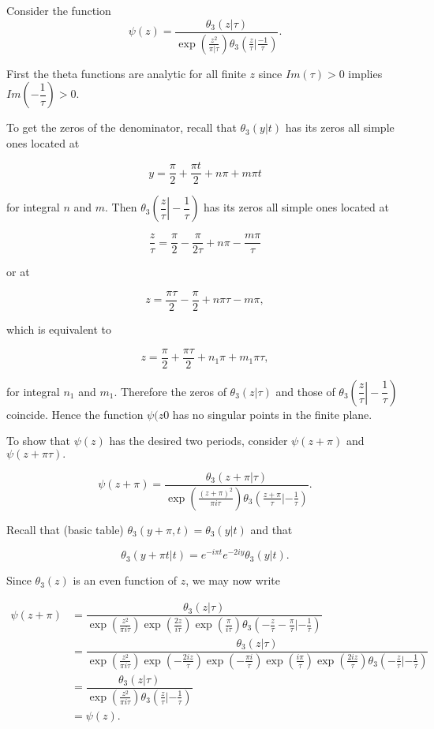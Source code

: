 \begin{solution}
Consider the function
$$\psi(z) = \dfrac{\theta_3(z | \tau)}{\exp \left( \frac{z^2}{\pi | \tau} \right) \theta_3(\frac{z}{\tau} | \frac{-1}{\tau})}.$$

First the theta functions are analytic for all finite $z$ since $Im(\tau) > 0$ implies $Im\left( -\dfrac{1}{\tau} \right) > 0.$ 

To get the zeros of the denominator, recall that $\theta_3(y|t)$ has its zeros all simple ones located at

$$y = \dfrac{\pi}{2} + \dfrac{\pi t}{2} + n \pi + m \pi t$$

for integral $n$ and $m$. Then $\theta_3 \left( \left. \dfrac{z}{\tau} \right| -\dfrac{1}{\tau} \right)$ has its zeros all simple ones located at

$$\dfrac{z}{\tau} = \dfrac{\pi}{2} - \dfrac{\pi}{2 \tau} + n \pi - \dfrac{m \pi}{\tau}$$

or at

$$z = \dfrac{\pi \tau}{2} - \dfrac{\pi}{2} + n \pi \tau - m \pi,$$

which is equivalent to 

$$z = \dfrac{\pi}{2} + \dfrac{\pi \tau}{2} + n_1 \pi + m_1 \pi \tau,$$

for integral $n_1$ and $m_1$. Therefore the zeros of $\theta_3 \left( z | \tau \right)$ and those of $\theta_3 \left( \left. \dfrac{z}{\tau} \right| -\dfrac{1}{\tau} \right)$ coincide. Hence the function $\psi(z0$ has no singular points in the finite plane.

To show that $\psi(z)$ has the desired two periods, consider $\psi(z+\pi)$ and $\psi(z+\pi \tau).$

$$\psi(z+\pi) = \dfrac{\theta_3(z+\pi | \tau)}{\exp \left(\frac{(z+ \pi)^2}{\pi i \tau} \right) \theta_3 \left( \frac{z+\pi}{\tau} | -\frac{1}{\tau} \right)}.$$

Recall that (basic table) $\theta_3(y+\pi,t) = \theta_3(y|t)$ and that

$$\theta_3(y+\pi t| t) = e^{-i \pi t} e^{-2iy} \theta_3(y|t).$$

Since $\theta_3(z)$ is an even function of $z$, we may now write

$$\begin{array}{ll}
\psi(z+\pi) &= \dfrac{\theta_3(z|\tau)}{\exp \left( \frac{z^2}{\pi i \tau} \right) \exp \left( \frac{2z}{i \tau} \right) \exp \left( \frac{\pi}{i \tau} \right) \theta_3 \left( -\frac{z}{\tau} - \frac{\pi}{\tau} | - \frac{1}{\tau} \right)} \\
&= \dfrac{\theta_3(z|\tau)}{\exp \left( \frac{z^2}{\pi i \tau} \right) \exp \left( - \frac{2 i z}{\tau} \right) \exp \left( - \frac{\pi i}{\tau} \right) \exp \left( \frac{i \pi}{\tau} \right) \exp \left( \frac{2i z}{\tau} \right) \theta_3 \left( - \frac{z}{\tau} | - \frac{1}{\tau} \right)} \\
&= \dfrac{\theta_3(z | \tau)}{\exp \left( \frac{z^2}{\pi i \tau} \right) \theta_3 \left( \frac{z}{\tau} | - \frac{1}{\tau} \right)} \\
&= \psi(z).
\end{array}$$


\end{solution}
